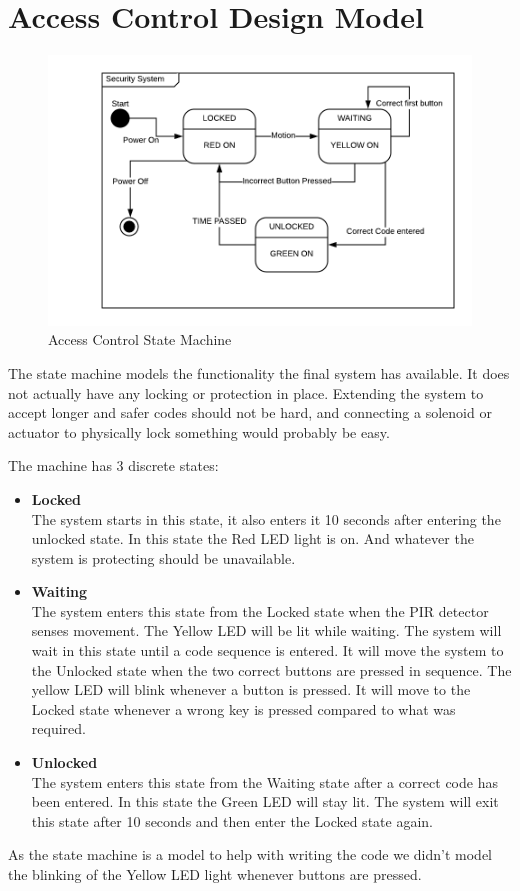 \section{Access Control Design Model}
\begin{figure}[H]
  \centering
  \includegraphics[scale=0.75]{figs/StateMachine.png}
  \caption{Access Control State Machine}
  \label{fig:StateMachine}
\end{figure}
The state machine models the functionality the final system has available. It does not actually have any locking or protection in place. Extending the system to accept longer and safer codes should not be hard, and connecting a solenoid or actuator to physically lock something would probably be easy. 

The machine has 3 discrete states: 
\begin{itemize}
  \item \textbf{Locked} \\
The system starts in this state, it also enters it 10 seconds after entering the unlocked state.
In this state the Red LED light is on. And whatever the system is protecting should be unavailable.
  \item \textbf{Waiting}\\
The system enters this state from the Locked state when the PIR detector senses movement. 
The Yellow LED will be lit while waiting. 
The system will wait in this state until a code sequence is entered. It will move the system to the Unlocked state when the two correct buttons are pressed in sequence. The yellow LED will blink whenever a button is pressed. It will move to the Locked state whenever a wrong key is pressed compared to what was required.
  \item \textbf{Unlocked}\\
The system enters this state from the Waiting state after a correct code has been entered. In this state the Green LED will stay lit. 
The system will exit this state after 10 seconds and then enter the Locked state again. 
\end{itemize}

As the state machine is a model to help with writing the code we didn't model the blinking of the Yellow LED light whenever buttons are pressed. 
\pagebreak